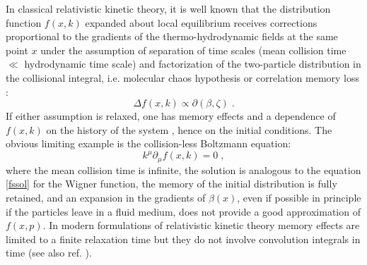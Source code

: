 \documentclass[prd,superscriptaddress,nofootinbib,notitlepage]{revtex4-1}
\begin{document}
In classical relativistic kinetic theory, it is well known that the distribution function $f(x,k)$ expanded about local 
equilibrium receives corrections proportional to the gradients of the thermo-hydrodynamic fields at the same point $x$
\cite{DeGroot:1980dk} under the assumption of separation of time scales (mean collision time $\ll$ hydrodynamic time scale) 
and factorization of the two-particle distribution in the collisional integral, i.e. molecular chaos hypothesis or correlation 
memory loss \cite{cercignani2002}:
%
$$
  \Delta f(x,k) \propto \partial (\beta, \zeta)\;.
$$
%
If either assumption is relaxed, one has memory effects and a dependence of $f(x,k)$ on the history of the system 
\cite{Danielewicz:1982kk,KODAMAKOIDE,KOIDE}, hence on the initial conditions. The obvious limiting example is the 
collision-less Boltzmann equation:
%
$$
  k^\mu \partial_\mu f(x,k) = 0\;,
$$
%
where the mean collision time is infinite, the solution is analogous to the equation \eqref{fssol} for the Wigner function, 
the memory of the initial distribution is fully retained, and an expansion in the gradients of $\beta(x)$, even if possible 
in principle if the particles leave in a fluid medium, does not provide a good approximation of $f(x,p)$. 
In modern formulations of relativistic kinetic theory \cite{DNMR} memory effects are limited to a finite relaxation time
but they do not involve convolution integrals in time (see also ref. \cite{Abbasi:2025teu}).
\end{document}
